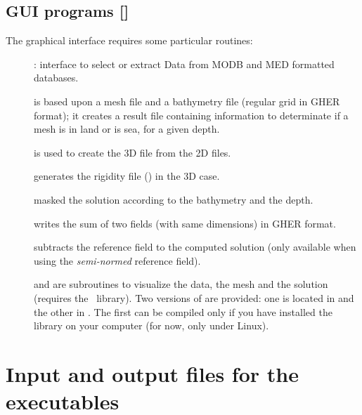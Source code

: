 \subsection[GUI programs]{GUI programs []}

The graphical interface requires some particular routines:
\begin{description}
\item[]: interface to select or extract Data from MODB and MED formatted databases.
\vspace{.25cm}
\item[] is based upon a mesh file and a bathymetry file (regular grid in GHER format); it creates a result file containing information to determinate if a mesh is in land or is sea, for a given depth.
\vspace{.25cm}
\item[] is used to create the 3D file from the 2D files.
\item[] generates the rigidity file () in the 3D case.
\item[] masked the solution according to the bathymetry and the depth.
\item[] writes the sum of two fields (with same dimensions) in GHER format.
\item[] subtracts the reference field to the computed solution (only available when using the \textit{semi-normed} reference field).
\vspace{.25cm}
\item[] and  are subroutines to visualize the data, the mesh and the solution (requires the \plplot\, library). Two versions of  are provided: one is located in  and the other in . The first can be compiled only if you have installed the \plplot library on your computer (for now, only under Linux).
\end{description}



\section{Input and output files for the executables}

